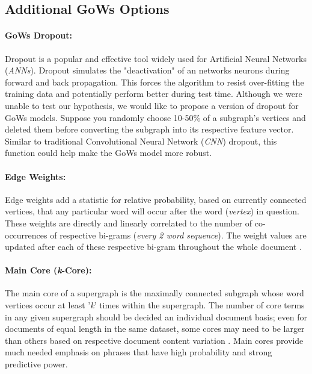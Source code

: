 \documentclass[twoside,twocolumn]{article}
\begin{document}
\subsection{Additional GoWs Options}

\paragraph{GoWs Dropout:} Dropout is a popular and effective tool widely used for Artificial Neural Networks (\textit{ANNs}). Dropout simulates the "deactivation" of an network\textquotesingle s neurons during forward and back propagation. This forces the algorithm to resist over-fitting the training data and potentially perform better during test time. Although we were unable to test our hypothesis, we would like to propose a version of dropout for GoWs models. Suppose you randomly choose 10-50\% of a subgraph's vertices and deleted them before converting the subgraph into its respective feature vector. Similar to traditional Convolutional Neural Network (\textit{CNN}) dropout, this function could help make the GoWs model more robust.

\paragraph{Edge Weights:} Edge weights add a statistic for relative probability, based on currently connected vertices, that any particular word will occur after the word (\textit{vertex}) in question. These weights are directly and linearly correlated to the number of co-occurrences of respective bi-grams (\textit{every 2 word sequence}). The weight values are updated after each of these respective bi-gram throughout the whole document \cite{Rousseau2015}.

\paragraph{Main Core (\textit{k}-Core):} The main core of a supergraph is the maximally connected subgraph whose word vertices occur at least '\textit{k}' times within the supergraph. The number of core terms in any given supergraph should be decided an individual document basis; even for documents of equal length in the same dataset, some cores may need to be larger than others based on respective document content variation \cite{Rousseau2015}. Main cores provide much needed emphasis on phrases that have high probability and strong predictive power. 
\end{document}
